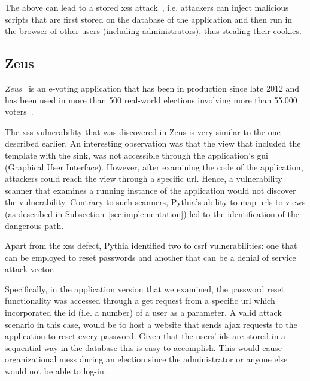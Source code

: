 \noindent
The above can lead to a stored {\sc xss} attack~\cite{MLPK17},
i.e. attackers can inject malicious scripts
that are first stored on the database
of the application
and then run in the browser of other users
(including administrators),
thus stealing their cookies.


\subsection{Zeus}
\label{sec:zeus}

{\it Zeus}~\cite{zeus-jets, zeus}
is an e-voting application
that has been in production
since late 2012 and
has been used in more than 500
real-world elections involving
more than 55,000 voters~\cite{pnrmx-del}.

The {\sc xss} vulnerability
that was discovered in Zeus is very
similar to the one described earlier.
An interesting observation
was that the view that included
the template with the sink,
was not accessible through the
application's
{\sc gui} (Graphical User Interface).
However,
after examining the code of the application,
attackers could reach the view through
a specific {\sc url}.
Hence,
a vulnerability scanner that examines
a running instance of the application
would not discover the vulnerability.
Contrary to such scanners,
Pythia's
ability to map {\sc url}s to views
(as described in
Subsection~\ref{sec:implementation})
led to the identification of the
dangerous path.

Apart from the {\sc xss} defect,
Pythia identified two
to {\sc csrf} vulnerabilities:
one that can be employed to reset
passwords and another that
can be a denial of service attack vector.

Specifically,
in the application version that we examined,
the password reset functionality was
accessed through a {\sc get} request from
a specific {\sc url} which incorporated
the {\sc id} (i.e. a number) of a user
as a parameter.
A valid attack scenario in this case,
would be to host a website that sends
{\sc ajax} requests to the application
to reset every password.
Given that the users' {\sc id}s
are stored in a sequential way
in the database this is easy to accomplish.
This would cause organizational mess
during an election since the administrator
or anyone else would not be able to log-in.

